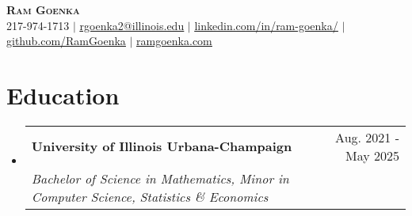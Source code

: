 \documentclass[letterpaper,11pt]{article}
\makeatletter
\newcommand{\resumeSubheading}[4]{
  \vspace{-2pt}\item
    \begin{tabular*}{0.97\textwidth}[t]{l@{\extracolsep{\fill}}r}
      \textbf{#1} & #2 \\
      \textit{\small#3} & \textit{\small #4} \\
    \end{tabular*}\vspace{-7pt}
}
\newcommand{\resumeSubheading}[4]{
  \vspace{-2pt}\item
    \begin{tabular*}{0.97\textwidth}[t]{l@{\extracolsep{\fill}}r}
      \textbf{#1} & #2 \\
      \textit{\small#3} & \textit{\small #4} \\
    \end{tabular*}\vspace{-7pt}}
\newcommand{\resumeSubHeadingListStart}{\begin{itemize}[leftmargin=0.15in, label={}]}
\newcommand{\resumeSubHeadingListEnd}{\end{itemize}}
\makeatother
\begin{document}
\begin{center}
    \textbf{\Huge \scshape Ram Goenka} \\ \vspace{1pt}
    \small 217-974-1713 $|$ \href{mailto:rgoenka2@illinois.edu}{\underline{rgoenka2@illinois.edu}} $|$ 
    \href{https://www.linkedin.com/in/ram-goenka/}{\underline{linkedin.com/in/ram-goenka/}} $|$
    \href{https://github.com/RamGoenka}{\underline{github.com/RamGoenka}} $|$
    \href{http://ramgoenka.com/}{\underline{ramgoenka.com}}
\end{center}

\section{Education}
  \resumeSubHeadingListStart
    \resumeSubheading
      {University of Illinois Urbana-Champaign}{Aug. 2021 - May 2025}
      {Bachelor of Science in Mathematics, Minor in Computer Science, Statistics \& Economics}{}
  \resumeSubHeadingListEnd


\end{document}
